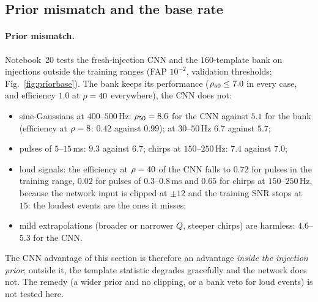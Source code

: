 \subsection{Prior mismatch and the base rate}\label{sec:priorshift}
\paragraph{Prior mismatch.} Notebook~20 tests the fresh-injection CNN and the $160$-template bank on injections outside the training ranges (FAP $10^{-2}$, validation thresholds; Fig.~\ref{fig:priorbase}). The bank keeps its performance ($\rho_{50}\le7.0$ in every case, and efficiency $1.0$ at $\rho=40$ everywhere), the CNN does not:
\begin{itemize}[nosep]
\item sine-Gaussians at $400$--$500\,$Hz: $\rho_{50}=8.6$ for the CNN against $5.1$ for the bank (efficiency at $\rho=8$: $0.42$ against $0.99$); at $30$--$50\,$Hz $6.7$ against $5.7$;
\item pulses of $5$--$15\,$ms: $9.3$ against $6.7$; chirps at $150$--$250\,$Hz: $7.4$ against $7.0$;
\item loud signals: the efficiency at $\rho=40$ of the CNN falls to $0.72$ for pulses in the training range, $0.02$ for pulses of $0.3$--$0.8\,$ms and $0.65$ for chirps at $150$--$250\,$Hz, because the network input is clipped at $\pm12$ and the training SNR stops at $15$: the loudest events are the ones it misses;
\item mild extrapolations (broader or narrower $Q$, steeper chirps) are harmless: $4.6$--$5.3$ for the CNN.
\end{itemize}
The CNN advantage of this section is therefore an advantage \emph{inside the injection prior}; outside it, the template statistic degrades gracefully and the network does not. The remedy (a wider prior and no clipping, or a bank veto for loud events) is not tested here.
